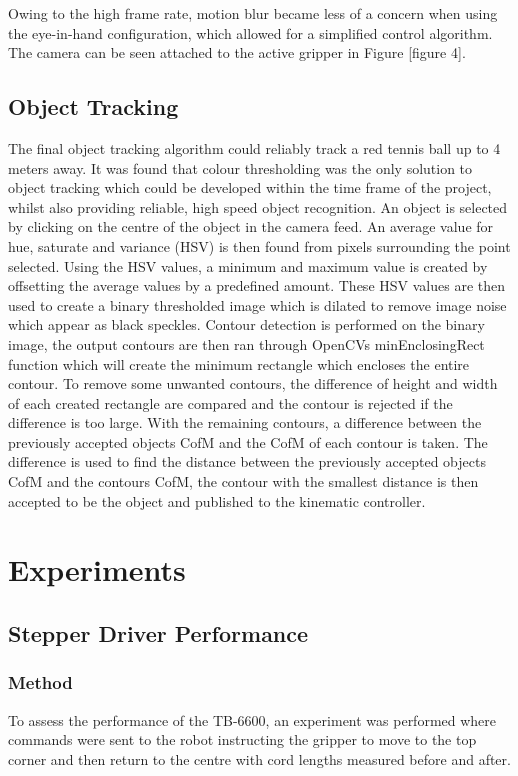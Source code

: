 \documentclass[conference]{IEEEtran}
\begin{document}
	Owing to the high frame rate, motion blur became less of a concern when using the eye-in-hand configuration, which allowed for a simplified control algorithm. The camera can be seen attached to the active gripper in Figure [figure 4].
	
	\subsection{Object Tracking}
	The final object tracking algorithm could reliably track a red tennis ball up to 4 meters away. It was found that colour thresholding was the only solution to object tracking which could be developed within the time frame of the project, whilst also providing reliable, high speed object recognition. An object is selected by clicking on the centre of the object in the camera feed. An average value for hue, saturate and variance (HSV) is then found from pixels surrounding the point selected. Using the HSV values, a minimum and maximum value is created by offsetting the average values by a predefined amount. These HSV values are then used to create a binary thresholded image which is dilated to remove image noise which appear as black speckles. Contour detection is performed on the binary image, the output contours are then ran through OpenCVs minEnclosingRect function which will create the minimum rectangle which encloses the entire contour. To remove some unwanted contours, the difference of height and width of each created rectangle are compared and the contour is rejected if the difference is too large. With the remaining contours, a difference between the previously accepted objects CofM and the CofM of each contour is taken. The difference is used to find the distance between the previously accepted objects CofM and the contours CofM, the contour with the smallest distance is then accepted to be the object and published to the kinematic controller.
		
	\section{Experiments}\label{experiments}
	\subsection{Stepper Driver Performance}\label{stepperReliability}
	\subsubsection{Method}
	To assess the performance of the TB-6600, an experiment was performed where commands were sent to the robot instructing the gripper to move to the top corner and then return to the centre with cord lengths measured before and after. 
\end{document}
